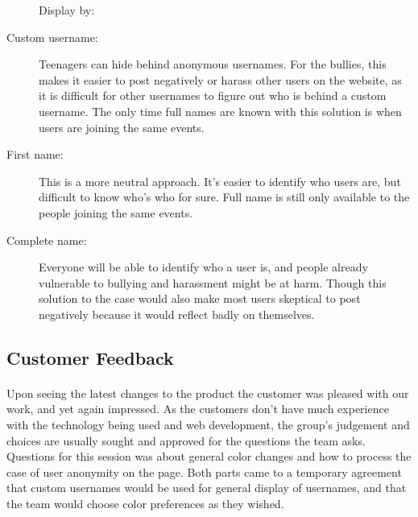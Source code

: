 \begin{description}
Display by: 
  \item[Custom username: ] Teenagers can hide behind anonymous usernames. For the bullies, this makes it easier to post negatively or harass other users on the website, as it is difficult for other usernames to figure out who is behind a custom username. The only time full names are known with this solution is when users are joining the same events. 
  \item[First name: ] This is a more neutral approach. It's easier to identify who users are, but difficult to know who's who for sure. Full name is still only available to the people joining the same events. 
  \item[Complete name: ] Everyone will be able to identify who a user is, and people already vulnerable to bullying and harassment might be at harm. Though this solution to the case would also make most users skeptical to post negatively because it would reflect badly on themselves. 
\end{description}


\subsection{Customer Feedback}

\paragraph{} Upon seeing the latest changes to the product the customer was pleased with our work, and yet again impressed. As the customers don't have much experience with the technology being used and web development, the group's judgement and choices are usually sought and approved for the questions the team asks. Questions for this session was about general color changes and how to process the case of user anonymity on the page. Both parts came to a temporary agreement that custom usernames would be used for general display of usernames, and that the team would choose color preferences as they wished. 
